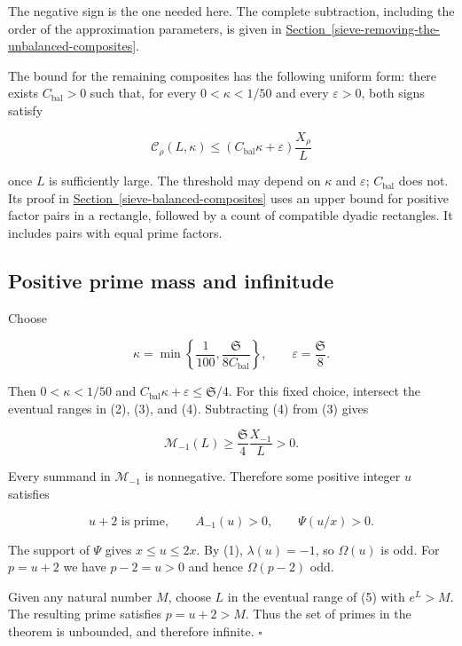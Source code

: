 The negative sign is the one needed here. The complete subtraction,
including the order of the approximation parameters, is given in
\protect\hyperlink{sieve-removing-the-unbalanced-composites}{Section~\ref{sieve-removing-the-unbalanced-composites}}.

The bound for the remaining composites has the following uniform form:
there exists \(C_{\mathrm{bal}}>0\) such that, for every
\(0<\kappa<1/50\) and every \(\varepsilon>0\), both signs satisfy

\[
\mathcal C_\rho(L,\kappa)
 \le (C_{\mathrm{bal}}\kappa+\varepsilon)\frac{X_\rho}L
 \tag{4}
\]

once \(L\) is sufficiently large. The threshold may depend on \(\kappa\)
and \(\varepsilon\); \(C_{\mathrm{bal}}\) does not. Its proof in
\protect\hyperlink{sieve-balanced-composites}{Section~\ref{sieve-balanced-composites}}
uses an upper bound for positive factor pairs in a rectangle, followed
by a count of compatible dyadic rectangles. It includes pairs with equal
prime factors.


\hypertarget{proof-positive-prime-mass-and-infinitude}{%
\subsection{Positive prime mass and
infinitude}\label{proof-positive-prime-mass-and-infinitude}}

Choose

\[
\kappa=\min\left\{\frac1{100},
                  \frac{\mathfrak S}{8C_{\mathrm{bal}}}\right\},
\qquad \varepsilon=\frac{\mathfrak S}{8}.
\]

Then \(0<\kappa<1/50\) and
\(C_{\mathrm{bal}}\kappa+\varepsilon\le\mathfrak S/4\). For this fixed
choice, intersect the eventual ranges in (2), (3), and (4). Subtracting
(4) from (3) gives

\[
\mathcal M_{-1}(L)
 \ge\frac{\mathfrak S}{4}\frac{X_{-1}}L>0. \tag{5}
\]

Every summand in \(\mathcal M_{-1}\) is nonnegative. Therefore some
positive integer \(u\) satisfies

\[
u+2\text{ is prime},\qquad A_{-1}(u)>0,\qquad\Psi(u/x)>0.
\]

The support of \(\Psi\) gives \(x\le u\le2x\). By (1),
\(\lambda(u)=-1\), so \(\Omega(u)\) is odd. For \(p=u+2\) we have
\(p-2=u>0\) and hence \(\Omega(p-2)\) odd.

Given any natural number \(M\), choose \(L\) in the eventual range of
(5) with \(e^L>M\). The resulting prime satisfies \(p=u+2>M\). Thus the
set of primes in the theorem is unbounded, and therefore infinite.
\(\square\)
